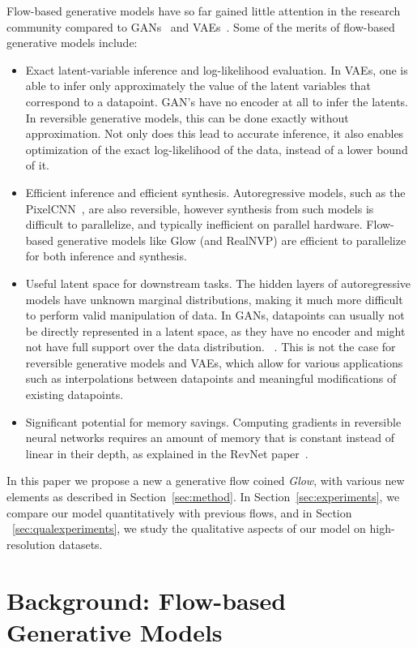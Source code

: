 \documentclass{article}
\begin{document}
Flow-based generative models have so far gained little attention in the research community compared to GANs~\citep{goodfellow2014generative} and VAEs~\citep{kingma2013auto}. Some of the merits of flow-based generative models include:
\begin{itemize}
\item Exact latent-variable inference and log-likelihood evaluation. In VAEs, one is able to infer only approximately the value of the latent variables that correspond to a datapoint. GAN’s have no encoder at all to infer the latents. In reversible generative models, this can be done exactly without approximation. Not only does this lead to accurate inference, it also enables optimization of the exact log-likelihood of the data, instead of a lower bound of it.
\item Efficient inference and efficient synthesis. Autoregressive models, such as the PixelCNN~\citep{oord2016conditional}, are also reversible, however synthesis from such models is difficult to parallelize, and typically inefficient on parallel hardware. Flow-based generative models like Glow (and RealNVP) are efficient to parallelize for both inference and synthesis.
\item Useful latent space for downstream tasks. The hidden layers of autoregressive models have unknown marginal distributions, making it much more difficult to perform valid manipulation of data. In GANs, datapoints can usually not be directly represented in a latent space, as they have no encoder and might not have full support over the data distribution. ~\citep{grover2018flow}. This is not the case for reversible generative models and VAEs, which allow for various applications such as interpolations between datapoints and meaningful modifications of existing datapoints.
\item Significant potential for memory savings. Computing gradients in reversible neural networks requires an amount of memory that is constant instead of linear in their depth, as explained in the RevNet paper~\citep{gomez2017reversible}.
\end{itemize}

In this paper we propose a new a generative flow coined \emph{Glow}, with various new elements as described in Section~\ref{sec:method}. In Section~\ref{sec:experiments}, we compare our model quantitatively with previous flows, and in Section ~\ref{sec:qualexperiments}, we study the qualitative aspects of our model on high-resolution datasets.

\section{Background: Flow-based Generative Models}\label{sec:flow}
\begin{comment}
 - Explain mathematics behind NICE / RealNVP
 - Explain benefits
 - Explain downsides: potential downsides of bipartite structure
\end{comment}
\end{document}
